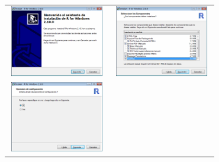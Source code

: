\documentclass[]{book}
\begin{document}
\begin{longtable}[]{@{}cc@{}}
\toprule
\includegraphics[width=0.95000\textwidth]{figuras/image3.png} &
\includegraphics[width=0.95000\textwidth]{figuras/image4.png}\tabularnewline
\includegraphics[width=0.95000\textwidth]{figuras/image5.png} &

\end{longtable}
\end{document}
